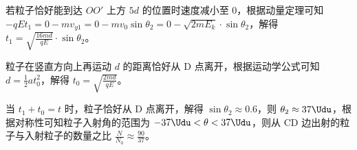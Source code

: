 \documentclass[\gkver]{gaokaozhenti}
\begin{document}
\begin{enumerate}
{\begin{enumerate}
	若粒子恰好能到达 $OO'$ 上方 $5d$ 的位置时速度减小至 0，根据动量定理可知 $-qEt_{1} = 0 - mv_{y1} = 0 - mv_{0} \sin \theta_{2} = 0 - \sqrt{2mE_{k}} \cdot \sin \theta_{2}$，解得 $t_{1} = \sqrt{\frac{16md}{qE}} \cdot \sin \theta_{2}$。

	粒子在竖直方向上再运动 $d$ 的距离恰好从 D 点离开，根据运动学公式可知 $d = \frac{1}{2} at_{0}^{2}$，解得 $t_{0}=\sqrt{\frac{2md}{qE}}$。

	当 $t_{1} + t_{0} = t$ 时，粒子恰好从 D 点离开，解得 $\sin \theta_{2} \approx 0.6$，则 $\theta_{2} \approx 37\Udu$，根据对称性可知粒子入射角的范围为 $-37\Udu < \theta < 37\Udu$，则从 CD 边出射的粒子与入射粒子的数量之比 $\frac{N}{N_{0}} \approx \frac{90}{37}$。
\end{enumerate}
}

\end{enumerate}
\end{document}

